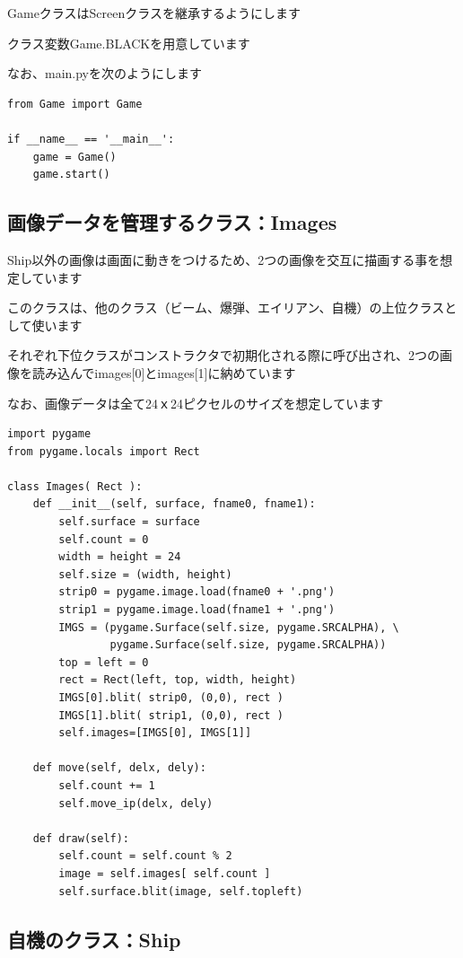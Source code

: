\documentclass[uplatex,a4paper,11pt,oneside,openany]{jsbook}
\begin{document}
GameクラスはScreenクラスを継承するようにします

クラス変数Game.BLACKを用意しています

なお、main.pyを次のようにします

\begin{lstlisting}[caption=main.py,label=p000]
from Game import Game

if __name__ == '__main__':
    game = Game()
    game.start()
\end{lstlisting}

\subsection{画像データを管理するクラス：Images}

Ship以外の画像は画面に動きをつけるため、2つの画像を交互に描画する事を想定しています

このクラスは、他のクラス（ビーム、爆弾、エイリアン、自機）の上位クラスとして使います

それぞれ下位クラスがコンストラクタで初期化される際に呼び出され、2つの画像を読み込んでimages[0]とimages[1]に納めています

なお、画像データは全て24ｘ24ピクセルのサイズを想定しています


\begin{lstlisting}[caption=Class Images,label=p003]
import pygame
from pygame.locals import Rect

class Images( Rect ):
    def __init__(self, surface, fname0, fname1):
        self.surface = surface
        self.count = 0
        width = height = 24
        self.size = (width, height)
        strip0 = pygame.image.load(fname0 + '.png')
        strip1 = pygame.image.load(fname1 + '.png')
        IMGS = (pygame.Surface(self.size, pygame.SRCALPHA), \
                pygame.Surface(self.size, pygame.SRCALPHA))
        top = left = 0
        rect = Rect(left, top, width, height)
        IMGS[0].blit( strip0, (0,0), rect )
        IMGS[1].blit( strip1, (0,0), rect )
        self.images=[IMGS[0], IMGS[1]]

    def move(self, delx, dely):
        self.count += 1
        self.move_ip(delx, dely)

    def draw(self):
        self.count = self.count % 2
        image = self.images[ self.count ]
        self.surface.blit(image, self.topleft)
\end{lstlisting}

\subsection{自機のクラス：Ship}
\end{document}
